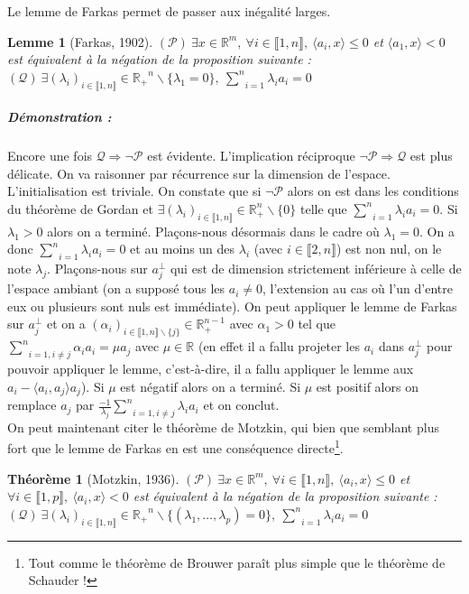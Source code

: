 \documentclass[10pt,a4paper]{article}
\newtheorem{thm}{Théorème}
\newtheorem{lemma}{Lemme}
\begin{document}
Le lemme de Farkas permet de passer aux inégalité larges.
\begin{lemma}[Farkas, 1902]
  $(\mathcal{P}) \  \exists x \in \mathbb{R}^m, \ \forall i \in \llbracket 1,n \rrbracket, \ \langle a_i,x \rangle \le 0$ et $\langle a_1,x \rangle < 0$ est équivalent à la négation de la proposition suivante : $ (\mathcal{Q}) \ \exists (\lambda_i)_{i \in \llbracket 1,n \rrbracket}\in \mathbb{R_+}^n \backslash\lbrace \lambda_1=0\rbrace, \ \underset{i=1}{\overset{n}{\sum}} \lambda_i a_i=0$
\end{lemma}
\subparagraph{Démonstration :} Encore une fois $\mathcal{Q} \Rightarrow \neg \mathcal{P}$ est évidente.
L'implication réciproque $\neg \mathcal{P} \Rightarrow \mathcal{Q}$ est plus délicate.
On va raisonner par récurrence sur la dimension de l'espace.
L'initialisation est triviale.
On constate que si $\neg \mathcal{P}$ alors on est dans les conditions du théorème de Gordan et $\exists (\lambda_i)_{i \in \llbracket 1, n\rrbracket} \in \mathbb{R}_+^n \backslash \lbrace 0 \rbrace$ telle que $\underset{i=1}{\overset{n}{\sum}} \lambda_i a_i=0$.
Si  $\lambda_1 >0$ alors on a terminé.
Plaçons-nous désormais dans le cadre où $\lambda_1=0$.
On a donc $\underset{i=1}{\overset{n}{\sum}} \lambda_i a_i=0$ et au moins un des $\lambda_i$ (avec $i \in \llbracket 2,n \rrbracket$) est non nul, on le note $\lambda_j$.
Plaçons-nous sur $a_j^{\perp}$ qui est de dimension strictement inférieure à celle de l'espace ambiant (on a supposé tous les $a_i \neq 0$, l'extension au cas où l'un d'entre eux ou plusieurs sont nuls est immédiate).
On peut appliquer le lemme de Farkas sur $a_j^{\perp}$ et on a $(\alpha_i)_{i \in \llbracket 1,n \rrbracket \backslash \lbrace j \rbrace} \in \mathbb{R}_+^{n-1}$ avec $\alpha_1>0$ tel que $\underset{i=1, i \neq j}{\overset{n}{\sum}}\alpha_i a_i= \mu a_j$ avec $\mu \in \mathbb{R}$ (en effet il a fallu projeter les $a_i$ dans $a_j^{\perp}$ pour pouvoir appliquer le lemme, c'est-à-dire, il a fallu appliquer le lemme aux $a_i-\langle a_i,a_j \rangle a_j$).
Si $\mu$ est négatif alors on a terminé.
Si $\mu$ est positif alors on remplace $a_j$ par $\frac{-1}{\lambda_j}\underset{i=1, i \neq j}{\overset{n}{\sum}}\lambda_i a_i$ et on conclut.
\\

On peut maintenant citer le théorème de Motzkin, qui bien que semblant plus fort que le lemme de Farkas en est une conséquence directe\footnote{Tout comme le théorème de Brouwer paraît plus simple que le théorème de Schauder !}.

\begin{thm}[Motzkin, 1936]
  $(\mathcal{P}) \  \exists x \in \mathbb{R}^m, \ \forall i \in \llbracket 1,n \rrbracket, \ \langle a_i,x \rangle \le 0$ et $\forall i \in \llbracket 1,p \rrbracket, \ \langle a_i,x \rangle < 0$
  est équivalent à la négation de la proposition suivante :
  $ (\mathcal{Q}) \ \exists (\lambda_i)_{i \in \llbracket 1,n \rrbracket}\in \mathbb{R_+}^n \backslash\lbrace (\lambda_1,\dots,\lambda_p)=0\rbrace, \ \underset{i=1}{\overset{n}{\sum}} \lambda_i a_i=0$
\end{thm}
\end{document}
